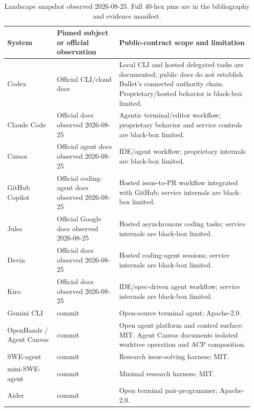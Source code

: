 \documentclass[journal]{IEEEtran}
\newcommand{\code}[1]{\texttt{\detokenize{#1}}}
\begin{document}
\begin{table}[!t]
\caption{Landscape snapshot observed 2026-08-25. Full 40-hex pins are in the bibliography and evidence manifest.}
\label{tab:landscape}
\centering
\tiny
\setlength{\tabcolsep}{3pt}
\begin{tabularx}{\textwidth}{@{}p{}p{}X@{}}
\toprule
System & Pinned subject or official observation & Public-contract scope and limitation \\
\midrule
Codex & Official CLI/cloud docs~\cite{openaiCodexCli,openaiCodexCloud} & Local CLI and hosted delegated tasks are documented; public docs do not establish Bullet's connected authority chain. Proprietary/hosted behavior is black-box limited. \\
Claude Code & Official docs observed 2026-08-25~\cite{claudeCode} & Agentic terminal/editor workflow; proprietary behavior and service controls are black-box limited. \\
Cursor & Official agent docs observed 2026-08-25~\cite{cursorAgent} & IDE/agent workflow; proprietary internals are black-box limited. \\
GitHub Copilot & Official coding-agent docs observed 2026-08-25~\cite{copilotAgent} & Hosted issue-to-PR workflow integrated with GitHub; service internals are black-box limited. \\
Jules & Official Google docs observed 2026-08-25~\cite{jules} & Hosted asynchronous coding tasks; service internals are black-box limited. \\
Devin & Official docs observed 2026-08-25~\cite{devin} & Hosted coding-agent sessions; service internals are black-box limited. \\
Kiro & Official docs observed 2026-08-25~\cite{kiro} & IDE/spec-driven agent workflow; service internals are black-box limited. \\
Gemini CLI & commit \code{812f7a2bcf20}~\cite{geminiCli} & Open-source terminal agent; Apache-2.0. \\
OpenHands / Agent Canvas & commit \code{150e76046db0}~\cite{openhands,agentCanvas} & Open agent platform and control surface; MIT. Agent Canvas documents isolated worktree operation and ACP composition. \\
SWE-agent & commit \code{3ea751c087f3}~\cite{sweAgent} & Research issue-solving harness; MIT. \\
mini-SWE-agent & commit \code{25941c89cfbc}~\cite{miniSweAgent} & Minimal research harness; MIT. \\
Aider & commit \code{5dc9490bb35f}~\cite{aider} & Open terminal pair-programmer; Apache-2.0. \\

\end{tabularx}
\end{table}
\end{document}
